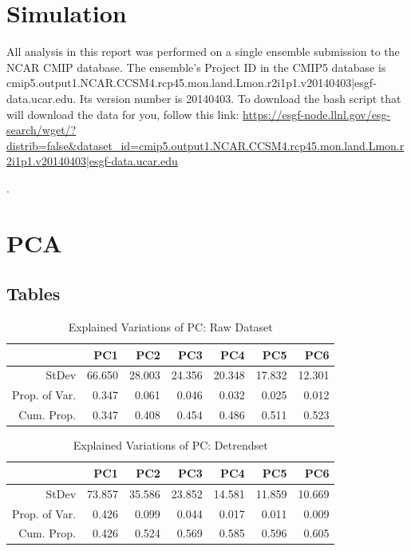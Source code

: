 \documentclass[11pt]{article}
\begin{document}
\appendix
\section{Simulation}
All analysis in this report was performed on a single ensemble submission to the
NCAR CMIP database. The ensemble's Project ID in the CMIP5 database is
cmip5.output1.NCAR.CCSM4.rcp45.mon.land.Lmon.r2i1p1.v20140403|esgf-data.ucar.edu.
Its version number is 20140403. To download the bash script that will download
the data for you, follow this link:
\url{https://esgf-node.llnl.gov/esg-search/wget/?distrib=false&dataset_id=cmip5.output1.NCAR.CCSM4.rcp45.mon.land.Lmon.r2i1p1.v20140403|esgf-data.ucar.edu}

.

\section{PCA}
\subsection{Tables}
\begin{table}[ht]
	\centering
	\begin{tabular}{rrrrrrr}
		\hline
		& PC1 & PC2 & PC3 & PC4 & PC5 & PC6 \\ 
		\hline
		StDev & 66.650 & 28.003 & 24.356 & 20.348 & 17.832 & 12.301 \\ 
		Prop. of Var. & 0.347 & 0.061 & 0.046 & 0.032 & 0.025 & 0.012 \\ 
		Cum. Prop.& 0.347 & 0.408 & 0.454 & 0.486 & 0.511 & 0.523 \\ 
		\hline
	\end{tabular}
	\caption{Explained Variations of PC: Raw Dataset}\label{table:rawdataprop}
\end{table}
\begin{table}[ht]
	\centering
	\begin{tabular}{rrrrrrr}
		\hline
		& PC1 & PC2 & PC3 & PC4 & PC5 & PC6 \\ 
		\hline
		StDev & 73.857 & 35.586 & 23.852 & 14.581 & 11.859 & 10.669 \\ 
		Prop. of Var. & 0.426 & 0.099 & 0.044 & 0.017 & 0.011 & 0.009 \\ 
		Cum. Prop. & 0.426 & 0.524 & 0.569 & 0.585 & 0.596 & 0.605 \\ 
		\hline
	\end{tabular}
	\caption{Explained Variations of PC: Detrendset}\label{table:detrendprop}
\end{table}
\pagebreak
\end{document}
